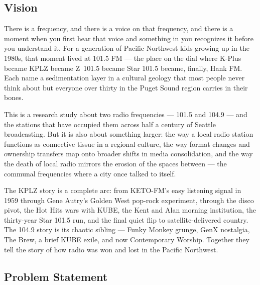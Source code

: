 \documentclass[11pt,letterpaper]{article}
\begin{document}
\subsection{Vision}

There is a frequency, and there is a voice on that frequency, and there is a moment when you first hear that voice and something in you recognizes it before you understand it. For a generation of Pacific Northwest kids growing up in the 1980s, that moment lived at 101.5 FM --- the place on the dial where K-Plus became KPLZ became Z~101.5 became Star 101.5 became, finally, Hank FM. Each name a sedimentation layer in a cultural geology that most people never think about but everyone over thirty in the Puget Sound region carries in their bones.

This is a research study about two radio frequencies --- 101.5 and 104.9 --- and the stations that have occupied them across half a century of Seattle broadcasting. But it is also about something larger: the way a local radio station functions as connective tissue in a regional culture, the way format changes and ownership transfers map onto broader shifts in media consolidation, and the way the death of local radio mirrors the erosion of the spaces between --- the communal frequencies where a city once talked to itself.

The KPLZ story is a complete arc: from KETO-FM's easy listening signal in 1959 through Gene Autry's Golden West pop-rock experiment, through the disco pivot, the Hot Hits wars with KUBE, the Kent and Alan morning institution, the thirty-year Star 101.5 run, and the final quiet flip to satellite-delivered country. The 104.9 story is its chaotic sibling --- Funky Monkey grunge, GenX nostalgia, The Brew, a brief KUBE exile, and now Contemporary Worship. Together they tell the story of how radio was won and lost in the Pacific Northwest.

\subsection{Problem Statement}
\end{document}
